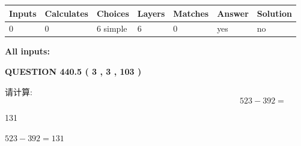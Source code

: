 \documentclass{ctexart}
\begin{document}
 
\noindent{}
 
 
   
   
   
   
\noindent\begin{tabular}{|l|l|l|l|l|l|l|}
 \hline
Inputs & Calculates & Choices & Layers & Matches & Answer & Solution \\ \hline
 0  & 
 0  & 
 6
  simple  
  & 
 6  & 
 0  & 
  yes & 
  no 
  \\ \hline
 \end{tabular}
   
   
   
   
\noindent{}
   
   
   
   
\noindent\vspace{0.1in}\hspace{-0.08in} {\textbf{\Large{All inputs: }}}
   
   
  
\vspace{0.2in}
  
{\textbf{\Large{QUESTION
440.5 
 ( 3 , 3 , 103 )
}}}
  
  
 
请计算:
\begin{equation}
523 -   %
392 = \nonumber
\end{equation}
 
 
 
\noindent{}
 
 

131
 
 
\noindent{}
 
 

 
 
 
\noindent{}
 
 

$ %
523 -  %
392=   %
131$
 
 
\noindent{}
 
 

 
   
\end{document}
